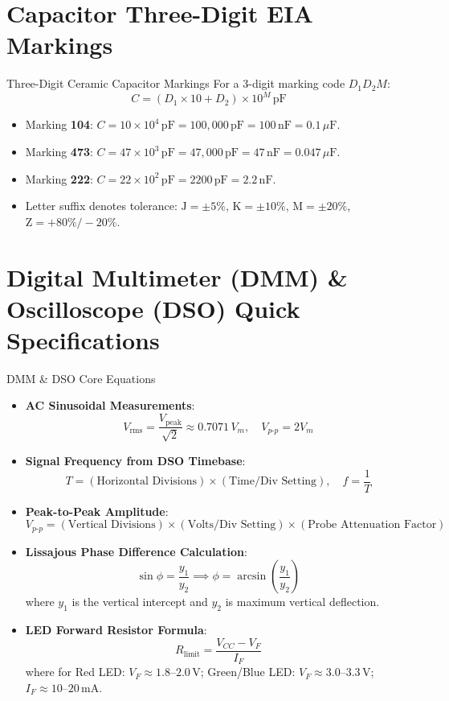 \section{Capacitor Three-Digit EIA Markings}
\begin{formulabox}{Three-Digit Ceramic Capacitor Markings}
For a 3-digit marking code $D_1 D_2 M$:
\[ C = (D_1 \times 10 + D_2) \times 10^M\,\mathrm{pF} \]
\begin{itemize}
    \item Marking \textbf{104}: $C = 10 \times 10^4\,\mathrm{pF} = 100{,}000\,\mathrm{pF} = 100\,\mathrm{nF} = 0.1\,\mu\mathrm{F}$.
    \item Marking \textbf{473}: $C = 47 \times 10^3\,\mathrm{pF} = 47{,}000\,\mathrm{pF} = 47\,\mathrm{nF} = 0.047\,\mu\mathrm{F}$.
    \item Marking \textbf{222}: $C = 22 \times 10^2\,\mathrm{pF} = 2200\,\mathrm{pF} = 2.2\,\mathrm{nF}$.
    \item Letter suffix denotes tolerance: $\mathrm{J} = \pm 5\%$, $\mathrm{K} = \pm 10\%$, $\mathrm{M} = \pm 20\%$, $\mathrm{Z} = +80\% / -20\%$.
\end{itemize}
\end{formulabox}

\section{Digital Multimeter (DMM) \& Oscilloscope (DSO) Quick Specifications}
\begin{formulabox}{DMM \& DSO Core Equations}
\begin{itemize}
    \item \textbf{AC Sinusoidal Measurements}:
    \[ V_{\mathrm{rms}} = \frac{V_{\mathrm{peak}}}{\sqrt{2}} \approx 0.7071\,V_m, \quad V_{p\text{-}p} = 2 V_m \]
    \item \textbf{Signal Frequency from DSO Timebase}:
    \[ T = (\text{Horizontal Divisions}) \times (\text{Time/Div Setting}), \quad f = \frac{1}{T} \]
    \item \textbf{Peak-to-Peak Amplitude}:
    \[ V_{p\text{-}p} = (\text{Vertical Divisions}) \times (\text{Volts/Div Setting}) \times (\text{Probe Attenuation Factor}) \]
    \item \textbf{Lissajous Phase Difference Calculation}:
    \[ \sin \phi = \frac{y_1}{y_2} \implies \phi = \arcsin\left(\frac{y_1}{y_2}\right) \]
    where $y_1$ is the vertical intercept and $y_2$ is maximum vertical deflection.
    \item \textbf{LED Forward Resistor Formula}:
    \[ R_{\mathrm{limit}} = \frac{V_{CC} - V_F}{I_F} \]
    where for Red LED: $V_F \approx 1.8\text{--}2.0\,\mathrm{V}$; Green/Blue LED: $V_F \approx 3.0\text{--}3.3\,\mathrm{V}$; $I_F \approx 10\text{--}20\,\mathrm{mA}$.
\end{itemize}
\end{formulabox}

